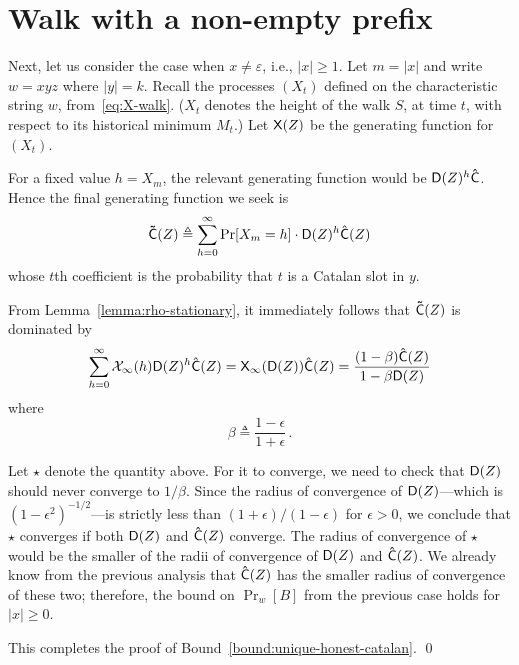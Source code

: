 \section{Walk with a non-empty prefix}
  Next, let us consider the case when $x \neq \varepsilon$, i.e., $|x| \geq 1$. 
  Let $m = |x|$ and write $w = xyz$ where $|y| = k$. 
  Recall the processes $(X_t)$ defined on the characteristic string $w$, 
  from~\eqref{eq:X-walk}.
  ($X_t$ denotes the height of the walk $S$, at time $t$, 
  with respect to its historical minimum $M_t$.)
  Let $\mathsf{X}(Z)$ be the generating function for $(X_t)$.

  For a fixed value $h = X_m$, the relevant generating function 
  would be $\mathsf{D}(Z)^{h}\mathsf{\hat{C}}$. 
  Hence the final generating function we seek is
  $$
    \mathsf{\tilde{C}}(Z) \triangleq \sum_{h = 0}^\infty \Pr[X_m = h] \cdot \mathsf{D}(Z)^h  \mathsf{\hat{C}}(Z)
  $$
  whose $t$th coefficient is the probability that 
  $t$ is a Catalan slot in $y$.

  From Lemma~\ref{lemma:rho-stationary}, it immediately follows that $\mathsf{\tilde{C}}(Z)$ is dominated by 
  $$
      \sum_{h = 0}^\infty \mathcal{X}_\infty(h) \mathsf{D}(Z)^h \mathsf{\hat{C}}(Z)
    = \mathsf{X}_\infty(\mathsf{D}(Z)) \mathsf{\hat{C}}(Z)
    = \frac{(1 - \beta)\mathsf{\hat{C}}(Z)}{1 - \beta \mathsf{D}(Z)}
  $$
  where $$\beta \triangleq \frac{1-\epsilon}{1+\epsilon}\,.$$

  Let $\star$ denote the quantity above. 
  For it to converge, 
  we need to check that $\mathsf{D}(Z)$
  should never converge to $1/\beta$.  
  Since the radius of convergence of $\mathsf{D}(Z)$---which is
  $(1-\epsilon^2)^{-1/2}$---is strictly less than 
  $(1+\epsilon)/(1-\epsilon)$ for $\epsilon > 0$, 
  we conclude that $\star$ converges if
  both $\mathsf{D}(Z)$ and $\mathsf{\hat{C}}(Z)$ converge.  The radius of
  convergence of $\star$ would be the smaller of the radii
  of convergence of $\mathsf{D}(Z)$ and $\mathsf{\hat{C}}(Z)$.  We already
  know from the previous analysis that $\mathsf{\hat{C}}(Z)$ has the
  smaller radius of convergence of these two; 
  therefore, the bound
  on $\Pr_w[B]$ from the previous case holds for $|x| \geq 0$. 

  This completes the proof of Bound~\ref{bound:unique-honest-catalan}.
  \hfill\qed




  



